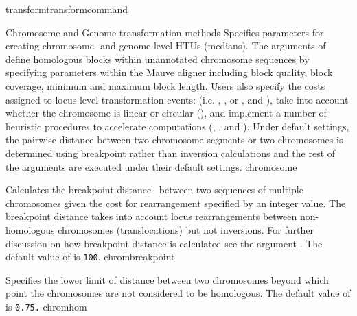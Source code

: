 \begin{command}{transform}{transformcommand}
\begin{arguments}
\begin{argumentgroup}{Chromosome and Genome transformation methods}
                {Specifies parameters for creating chro\-mosome- and genome-level 
                HTUs (medians). The arguments of  define 
                homologous blocks within unannotated chromosome sequences by
                specifying parameters within the Mauve aligner \cite{darlingetal2004} 
                including block quality, block coverage, minimum and maximum block
                 length. Users also specify the costs assigned to locus-level transformation 
                 events: (i.e. , , or 
                , and ), 
                take into account whether the chromosome is linear or circular 
                (), and implement a number of heuristic 
                procedures to accelerate computations (, 
                , and ).  
                Under default settings, the pairwise distance between two chromosome 
                segments or two chromosomes is determined using breakpoint rather 
                than inversion calculations and the rest of the arguments are executed 
                under their default settings.}
                {chromosome}
             
      		    {Calculates the breakpoint distance~\cite{blanchetteetal1997}
                between two sequences of multiple chromosomes given the cost for
                rearrangement specified by an integer value. The breakpoint distance
                takes into account locus rearrangements between non-homologous
                chromosomes (translocations) but not inversions. For further discussion on 
                how breakpoint distance is calculated see the argument .  
                The default value of  is \texttt{100}.} 
                {chrombreakpoint}
                        
            {Specifies the lower limit of distance between two chromosomes beyond which 
            point the chromosomes are not considered to be homologous. 
            The default value of  is \texttt{0.75.}}
            {chromhom}
      

\end{argumentgroup}
\end{arguments}
\end{command}

